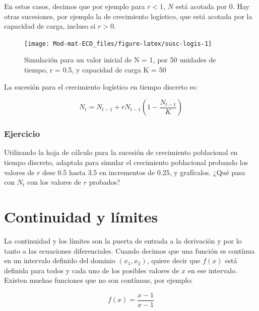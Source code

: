 \documentclass[
]{book}
\begin{document}
En estos casos, decimos que por ejemplo para \(r < 1\), \(N\) está acotada por \(0\). Hay otras sucesiones, por ejemplo la de crecimiento logístico, que está acotada por la capacidad de carga, incluso si \(r > 0\).

\begin{figure}

{\centering \texttt{[image: Mod-mat-ECO\_files/figure-latex/susc-logis-1]} 

}

\caption{Simulación para un valor inicial de N = 1, por 50 unidades de tiempo, r = 0.5, y capacidad de carga K = 50}\label{fig:susc-logis}
\end{figure}

La sucesión para el crecimiento logístico en tiempo discreto es:

\begin{equation}
N_{t} = N_{t-1} + r N_{t-1} \left(1 - \frac{N_{t-1}}{K} \right) \label{eq:susc-logis}
\end{equation}

\hypertarget{ejercicio-1}{%
\subsubsection{Ejercicio}\label{ejercicio-1}}

Utilizando la hoja de cálculo para la sucesión de crecimiento poblacional en tiempo discreto, adaptala para simular el crecimiento poblacional probando los valores de \(r\) dese 0.5 hasta 3.5 en incrementos de 0.25, y grafícalos. ¿Qué pasa con \(N_t\) con los valores de \(r\) probados?

\hypertarget{continuidad-y-luxedmites}{%
\section{Continuidad y límites}\label{continuidad-y-luxedmites}}

La continuidad y los límites son la puerta de entrada a la derivación y por lo tanto a las ecuaciones diferenciales. Cuando decimos que una función es contínua en un intervalo definido del dominio \((x_1, x_2)\), quiere decir que \(f(x)\) está definida para todos y cada uno de los posibles valores de \(x\) en ese intervalo. Existen muchas funciones que no son contínuas, por ejemplo:

\begin{equation}
    f(x) = \frac{x - 1}{x - 1} \label{eq:disc-1}
\end{equation}
\end{document}
